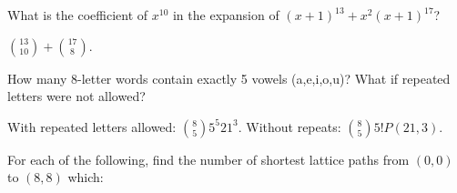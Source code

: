 \begin{questions}
	

\question What is the coefficient of $x^{10}$ in the expansion of $(x+1)^{13} + x^2(x+1)^{17}$?

	\begin{answer}
		${13 \choose 10} + {17 \choose 8}$.
	\end{answer}
	
	


\question How many 8-letter words contain exactly 5 vowels (a,e,i,o,u)?  What if repeated letters were not allowed?

	\begin{answer}
		 With repeated letters allowed: ${8 \choose 5}5^5 21^3$.  Without repeats: ${8 \choose 5}5! P(21, 3)$.
	\end{answer}
	
	


\question For each of the following, find the number of shortest lattice paths from $(0,0)$ to $(8,8)$ which:

	\begin{answer}
	\end{answer}
	

\end{questions}
